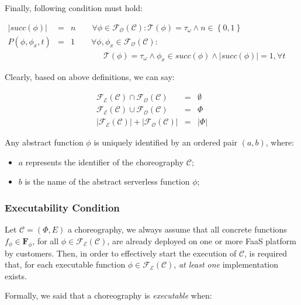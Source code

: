 \documentclass[12pt,a4paper]{report}
\begin{document}
\begin{itemize}
	Finally, following condition must hold:
	
	\begin{eqnarray}
		|succ(\phi)| & = & n \qquad \forall \phi \in \mathscr{F_O}(\mathcal{C}) : \mathscr{T}(\phi) = \tau_{\omega} \wedge n \in \left\{0,1\right\} \\		
		P(\phi, \phi_x,t) & = & 1 \qquad \forall \phi, \phi_x \in \mathscr{F_O}(\mathcal{C}) : \\		
		& & \qquad \qquad \mathscr{T}(\phi) = \tau_{\omega} \wedge \phi_x \in succ(\phi) \wedge |succ(\phi)| = 1, \forall t \qquad \qquad  \nonumber
	\end{eqnarray}
	
\end{itemize}

Clearly, based on above definitions, we can say: 

\begin{eqnarray}
	\mathscr{F_E}(\mathcal{C}) \cap \mathscr{F_O}(\mathcal{C}) & = & \emptyset \\
	\mathscr{F_E}(\mathcal{C}) \cup \mathscr{F_O}(\mathcal{C}) & = & \Phi \\
	|\mathscr{F_E}(\mathcal{C})| + |\mathscr{F_O}(\mathcal{C})| &=& |\Phi| 
\end{eqnarray}

Any abstract function $\phi$ is uniquely identified by an ordered pair $(a, b)$, where:
\begin{itemize}
	\item $a$ represents the identifier of the choreography $\mathcal{C}$;
	\item $b$ is the name of the abstract serverless function $\phi$;
\end{itemize}

\subsubsection{Executability Condition}

Let $\mathcal{C} = (\Phi,E)$ a choreography, we always assume that all concrete functions $f_{\phi} \in \textbf{F}_{\phi}$, for all $\phi \in \mathscr{F_E}(\mathcal{C})$, are already deployed on one or more FaaS platform by customers. Then, in order to effectively start the execution of $\mathcal{C}$, is required that, for each executable function $\phi \in \mathscr{F_E}(\mathcal{C})$, \textit{at least one} implementation exists.

Formally, we said that a choreography is \textit{executable} when: 
\end{document}
